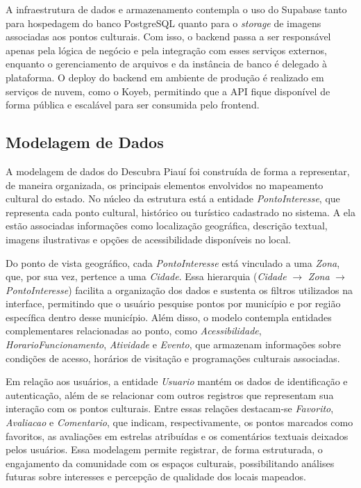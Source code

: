 A infraestrutura de dados e armazenamento contempla o uso do Supabase tanto para hospedagem do banco PostgreSQL quanto para o \textit{storage} de imagens associadas aos pontos culturais. Com isso, o backend passa a ser responsável apenas pela lógica de negócio e pela integração com esses serviços externos, enquanto o gerenciamento de arquivos e da instância de banco é delegado à plataforma. O deploy do backend em ambiente de produção é realizado em serviços de nuvem, como o Koyeb, permitindo que a API fique disponível de forma pública e escalável para ser consumida pelo frontend.

\subsection{Modelagem de Dados}

A modelagem de dados do Descubra Piauí foi construída de forma a representar, de maneira organizada, os principais elementos envolvidos no mapeamento cultural do estado. No núcleo da estrutura está a entidade \textit{PontoInteresse}, que representa cada ponto cultural, histórico ou turístico cadastrado no sistema. A ela estão associadas informações como localização geográfica, descrição textual, imagens ilustrativas e opções de acessibilidade disponíveis no local.

Do ponto de vista geográfico, cada \textit{PontoInteresse} está vinculado a uma \textit{Zona}, que, por sua vez, pertence a uma \textit{Cidade}. Essa hierarquia (\textit{Cidade} $\rightarrow$ \textit{Zona} $\rightarrow$ \textit{PontoInteresse}) facilita a organização dos dados e sustenta os filtros utilizados na interface, permitindo que o usuário pesquise pontos por município e por região específica dentro desse município. Além disso, o modelo contempla entidades complementares relacionadas ao ponto, como \textit{Acessibilidade}, \textit{HorarioFuncionamento}, \textit{Atividade} e \textit{Evento}, que armazenam informações sobre condições de acesso, horários de visitação e programações culturais associadas.

Em relação aos usuários, a entidade \textit{Usuario} mantém os dados de identificação e autenticação, além de se relacionar com outros registros que representam sua interação com os pontos culturais. Entre essas relações destacam-se \textit{Favorito}, \textit{Avaliacao} e \textit{Comentario}, que indicam, respectivamente, os pontos marcados como favoritos, as avaliações em estrelas atribuídas e os comentários textuais deixados pelos usuários. Essa modelagem permite registrar, de forma estruturada, o engajamento da comunidade com os espaços culturais, possibilitando análises futuras sobre interesses e percepção de qualidade dos locais mapeados.

